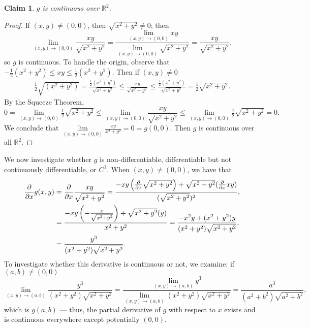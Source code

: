 \documentclass[11pt]{article}
\newtheorem*{claim*}{Claim}
\begin{document}
\begin{adjustwidth}{1cm}{}
    \begin{claim*}
    	$g$ is continuous over $\mathbb{R}^{2}$.
    \end{claim*}
    \begin{proof}\renewcommand{\qedsymbol}{}
    	If $(x, y) \ne (0, 0)$, then $\sqrt{x^{2} + y^{2}} \ne 0$; then
		\[
			\lim\limits_{(x, y) \to (0, 0)} \frac{xy}{\sqrt{x^{2} + y^{2}}} = \frac{\lim\limits_{(x, y) \to (0, 0) } xy}{\lim\limits_{(x, y) \to (0, 0)} \sqrt{x^{2} + y^{2}}} = \frac{xy}{\sqrt{x^{2} + y^{2}}},
		\]
		so $g$ is continuous. To handle the origin, observe that $-\tfrac{1}{2} (x^{2} + y^{2}) \le xy \le \tfrac{1}{2}(x^{2} + y^{2})$. Then if $(x, y) \ne 0$
    	\begin{align*}
			\tfrac{1}{2} \sqrt{(x^{2} + y^{2})} = \frac{\tfrac{1}{2}(x^{2} + y^{2})}{\sqrt{x^{2} + y^{2}}} \le \frac{xy}{\sqrt{x^{2} + y^{2}}} \le \frac{\tfrac{1}{2}(x^{2} + y^{2})}{\sqrt{x^{2} + y^{2}}} = \tfrac{1}{2} \sqrt{x^{2} + y^{2}}.
    	\end{align*}
		By the Squeeze Theorem,
		\[
			0 = \lim\limits_{(x, y) \to (0, 0)} \tfrac{1}{2} \sqrt{x^{2} + y^{2}} \le \lim\limits_{(x, y) \to (0, 0)} \frac{xy}{\sqrt{x^{2} + y^{2}}} \le \lim\limits_{(x, y) \to (0, 0)} \tfrac{1}{2} \sqrt{x^{2} + y^{2}} = 0.
		\]
		We conclude that $\lim\limits_{(x, y) \to (0, 0)} \frac{xy}{x^{2} + y^{2}} = 0 = g(0, 0)$. Then $g$ is continuous over all $\mathbb{R}^{2}$.
	\end{proof}
\end{adjustwidth}

We now investigate whether $g$ is non-differentiable, differentiable but not continuously differentiable, or $C^{1}$. When $(x, y) \ne (0, 0)$, we have that
\begin{align*}
	\pdv{x} g(x, y) &= \pdv{x} \frac{xy}{\sqrt{x^{2} + y^{2}}} = \frac{-xy \left( \pdv{x} \sqrt{x^{2} + y^{2}} \right) + \sqrt{x^{2} + y^{2}} (\pdv{x} xy)}{(\sqrt{x^{2} + y^{2}})^{2}}, \\
	&= \frac{-xy \left( - \frac{x}{\sqrt{x^{2} + y^{2}}} \right) + \sqrt{x^{2} + y^{2}}(y)}{x^{2} + y^{2}} = \frac{-x^{2}y + (x^{2} + y^{2})y}{(x^{2} + y^{2})\sqrt{x^{2} + y^{2}}}, \\
	&= \frac{y^{3}}{(x^{2} + y^{2})\sqrt{x^{2} + y^{2}}}.
\end{align*}
To investigate whether this derivative is continuous or not, we examine: if $(a, b) \ne (0, 0)$
\[
	\lim\limits_{(x, y) \to (a, b)} \frac{y^{3}}{(x^{2} + y^{2} )\sqrt{x^{2} + y^{2}}} = \frac{\lim\limits_{(x, y) \to (a, b)} y^{3}}{\lim\limits_{(x, y) \to (a, b)} (x^{2} + y^{2}) \sqrt{x^{2} + y^{2}}} = \frac{a^{3}}{(a^{2} + b^{2}) \sqrt{a^{2} + b^{2}}},
\]
which is $g(a, b)$ --- thus, the partial derivative of $g$ with respect to $x$ exists and is continuous everywhere except potentially $(0, 0)$. 
\end{document}
